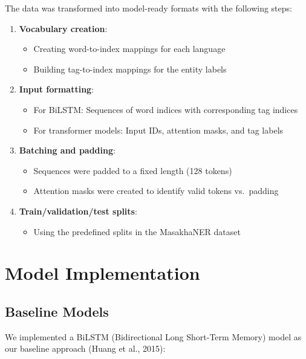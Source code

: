 \documentclass[
]{article}
\providecommand{\tightlist}{%
  \setlength{\itemsep}{0pt}\setlength{\parskip}{0pt}}\usepackage{longtable,booktabs,array}
\begin{document}
The data was transformed into model-ready formats with the following
steps:

\begin{enumerate}
\def\labelenumi{\arabic{enumi}.}
\tightlist
\item
  \textbf{Vocabulary creation}:

  \begin{itemize}
  \tightlist
  \item
    Creating word-to-index mappings for each language
  \item
    Building tag-to-index mappings for the entity labels
  \end{itemize}
\item
  \textbf{Input formatting}:

  \begin{itemize}
  \tightlist
  \item
    For BiLSTM: Sequences of word indices with corresponding tag indices
  \item
    For transformer models: Input IDs, attention masks, and tag labels
  \end{itemize}
\item
  \textbf{Batching and padding}:

  \begin{itemize}
  \tightlist
  \item
    Sequences were padded to a fixed length (128 tokens)
  \item
    Attention masks were created to identify valid tokens vs.~padding
  \end{itemize}
\item
  \textbf{Train/validation/test splits}:

  \begin{itemize}
  \tightlist
  \item
    Using the predefined splits in the MasakhaNER dataset
  \end{itemize}
\end{enumerate}

\section{Model Implementation}\label{model-implementation}

\subsection{Baseline Models}\label{baseline-models}

We implemented a BiLSTM (Bidirectional Long Short-Term Memory) model as
our baseline approach (Huang et al., 2015):
\end{document}
